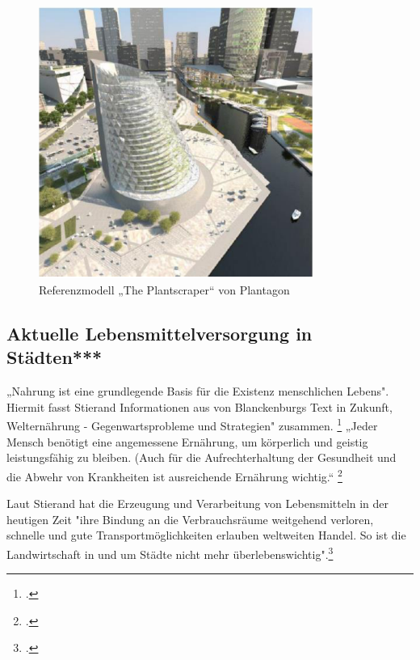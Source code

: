 \documentclass{scrartcl}
\begin{document}
\begin{figure}[htbp]
    \centering
    \includegraphics[width=9cm]{image_folder/plantscraper.png}
  \caption{Referenzmodell „The Plantscraper“ von Plantagon}
  \label{fig:plantagon_2}
\end{figure} 

\subsection{Aktuelle Lebensmittelversorgung in Städten***} 

„Nahrung ist eine grundlegende Basis für die Existenz menschlichen Lebens". Hiermit fasst Stierand Informationen aus von Blanckenburgs Text in Zukunft, Welternährung - Gegenwartsprobleme und Strategien" zusammen. \footcite[S.122f]{Stierand2008StadtLebensmittel} „Jeder Mensch benötigt eine angemessene Ernährung, um körperlich und geistig leistungsfähig zu bleiben. (Auch für die Aufrechterhaltung der Gesundheit und die Abwehr von Krankheiten ist ausreichende Ernährung wichtig.“ \footcite{Blanckenburg1987ZukunftDie}

Laut Stierand hat die Erzeugung und Verarbeitung von Lebensmitteln in der heutigen Zeit "ihre Bindung an die Verbrauchsräume weitgehend verloren, schnelle und gute Transportmöglichkeiten erlauben weltweiten Handel. So ist die Landwirtschaft in und um Städte nicht mehr überlebenswichtig".\footcite[S.122f]{Stierand2008StadtLebensmittel} 
\end{document}
